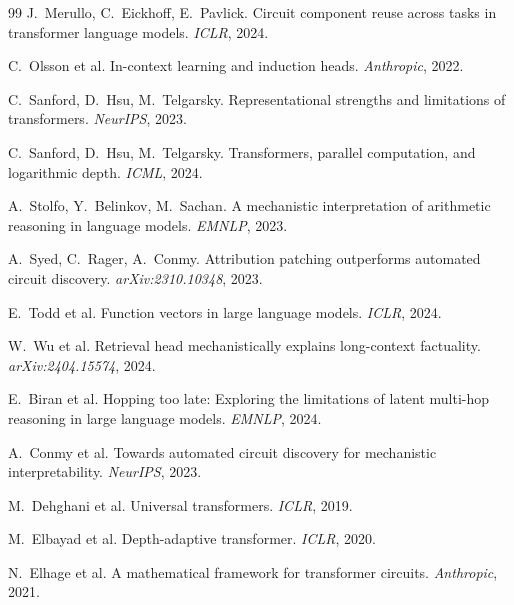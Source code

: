 \documentclass[11pt]{article}
\begin{document}
\begin{thebibliography}{99}
J.~Merullo, C.~Eickhoff, E.~Pavlick.
\newblock Circuit component reuse across tasks in transformer language models.
\newblock \emph{ICLR}, 2024.

C.~Olsson et al.
\newblock In-context learning and induction heads.
\newblock \emph{Anthropic}, 2022.

C.~Sanford, D.~Hsu, M.~Telgarsky.
\newblock Representational strengths and limitations of transformers.
\newblock \emph{NeurIPS}, 2023.

C.~Sanford, D.~Hsu, M.~Telgarsky.
\newblock Transformers, parallel computation, and logarithmic depth.
\newblock \emph{ICML}, 2024.

A.~Stolfo, Y.~Belinkov, M.~Sachan.
\newblock A mechanistic interpretation of arithmetic reasoning in language
models.
\newblock \emph{EMNLP}, 2023.

A.~Syed, C.~Rager, A.~Conmy.
\newblock Attribution patching outperforms automated circuit discovery.
\newblock \emph{arXiv:2310.10348}, 2023.

E.~Todd et al.
\newblock Function vectors in large language models.
\newblock \emph{ICLR}, 2024.

W.~Wu et al.
\newblock Retrieval head mechanistically explains long-context factuality.
\newblock \emph{arXiv:2404.15574}, 2024.

E.~Biran et al.
\newblock Hopping too late: Exploring the limitations of latent multi-hop
reasoning in large language models.
\newblock \emph{EMNLP}, 2024.

A.~Conmy et al.
\newblock Towards automated circuit discovery for mechanistic interpretability.
\newblock \emph{NeurIPS}, 2023.

M.~Dehghani et al.
\newblock Universal transformers.
\newblock \emph{ICLR}, 2019.

M.~Elbayad et al.
\newblock Depth-adaptive transformer.
\newblock \emph{ICLR}, 2020.

N.~Elhage et al.
\newblock A mathematical framework for transformer circuits.
\newblock \emph{Anthropic}, 2021.


\end{thebibliography}
\end{document}
